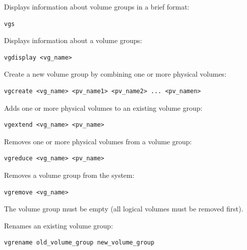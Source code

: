 \documentclass{article}
\newenvironment{blocktemplateIII}[1]{%
    \tcolorbox[beamer,%
    noparskip,breakable,
    ,colframe=Red,%
    colbacklower=LimeGreen!75!LightGreen,%
    title=#1]}%
    {\endtcolorbox}
\newenvironment{codetemplate}[1][]{%
  \mybasecolorbox[#1]
  \itshape
}{%
  \endmybasecolorbox
}
\begin{document}
Displays information about volume groups in a brief format:
\begin{codetemplate}
\begin{verbatim}
vgs
\end{verbatim}
\end{codetemplate}

Displays information about a volume groups:
\begin{codetemplate}
\begin{verbatim}
vgdisplay <vg_name>
\end{verbatim}
\end{codetemplate}

Create a new volume group by combining one or more physical volumes:
\begin{codetemplate}
\begin{verbatim}
vgcreate <vg_name> <pv_name1> <pv_name2> ... <pv_namen>
\end{verbatim}
\end{codetemplate}

Adds one or more physical volumes to an existing volume group:
\begin{codetemplate}
\begin{verbatim}
vgextend <vg_name> <pv_name>
\end{verbatim}
\end{codetemplate}

Removes one or more physical volumes from a volume group:
\begin{codetemplate}
\begin{verbatim}
vgreduce <vg_name> <pv_name>
\end{verbatim}
\end{codetemplate}
    
Removes a volume group from the system: 
\begin{codetemplate}
\begin{verbatim}
vgremove <vg_name>
\end{verbatim}
\end{codetemplate}

\begin{blocktemplateIII}{Warning}
The volume group must be empty (all logical volumes must be removed first).
\end{blocktemplateIII}

Renames an existing volume group:
\begin{codetemplate}
\begin{verbatim}
vgrename old_volume_group new_volume_group
\end{verbatim}
\end{codetemplate}
\end{document}
